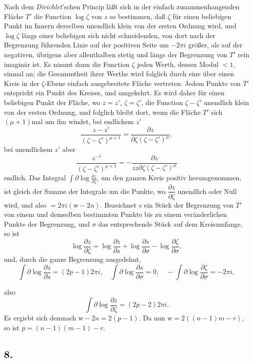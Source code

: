 \documentclass{article}
\begin{document}
Nach dem \emph{Dirichlet}'schen Princip läßt sich in der einfach zusammenhangenden Fläche $T'$ die Function $\log\zeta$ von $z$ so bestimmen, daß $\zeta$ für einen beliebigen Punkt im Innern derselben unendlich klein von der ersten Ordnung wird, und $\log\zeta$ längs einer beliebigen sich nicht schneidenden, von dort nach der Begrenzung führenden Linie auf der positiven Seite um $-2\pi i$ größer, als auf der negativen, übrigens aber allenthalben stetig und längs der Begrenzung von $T'$ rein imaginär ist. Es nimmt dann die Function $\zeta$ jeden Werth, dessen Modul $< 1$, einmal an; die Gesammtheit ihrer Werthe wird folglich durch eine über einen Kreis in der $\zeta$-Ebene einfach ausgebreitete Fläche vertreten. Jedem Punkte von $T'$ entspricht ein Punkt des Kreises, und umgekehrt. Es wird daher für einen beliebigen Punkt der Fläche, wo $z = z'$, $\zeta = \zeta'$, die Function $\zeta - \zeta'$ unendlich klein von der ersten Ordnung, und folglich bleibt dort, wenn die Fläche $T'$ sich $(\mu+1)$mal um ihn windet, bei endlichem $z'$
\[ \frac{z-z'}{(\zeta-\zeta')^{\mu+1}} = \frac{\partial z}{\partial\zeta(\zeta-\zeta')^{\mu}}, \]
bei unendlichem $z'$ aber
\[ \frac{z^{-1}}{(\zeta-\zeta')^{\mu+1}} = -\frac{\partial z}{zz \partial\zeta(\zeta-\zeta')^{\mu}} \]
endlich. Das Integral $\displaystyle\int \partial \log \frac{\partial z}{\partial\zeta}$, um den ganzen Kreis positiv herumgenommen, ist gleich der Summe der Integrale um die Punkte, wo $\dfrac{\partial z}{\partial\zeta}$ unendlich oder Null wird, und also $= 2\pi i(\mathrm{w} - 2n)$. Bezeichnet $s$ ein Stück der Begrenzung von $T'$ von einem und demselben bestimmten Punkte bis zu einem veränderlichen Punkte der Begrenzung, und $\sigma$ das entsprechende Stück auf dem Kreisumfange, so ist
\[ \log\frac{\partial z}{\partial\zeta} = \log\frac{\partial z}{\partial s} + \log\frac{\partial s}{\partial\sigma} - \log\frac{\partial\zeta}{\partial\sigma}, \]
und, durch die ganze Begrenzung ausgedehnt,
\[ \int \partial \log\frac{\partial z}{\partial s} = (2p-1)2\pi i, \quad \int \partial \log\frac{\partial s}{\partial\sigma} = 0, \quad -\int \partial \log\frac{\partial\zeta}{\partial\sigma} = -2\pi i, \]

also
\[ \int \partial \log\frac{\partial z}{\partial\zeta} = (2p-2)2\pi i. \]
Es ergiebt sich demnach $\mathrm{w} - 2n = 2(p-1)$. Da nun $\mathrm{w} = 2((n-1)m-r)$, so ist $p = (n-1)(m-1) - r$.

\subsection*{8.}
\end{document}

